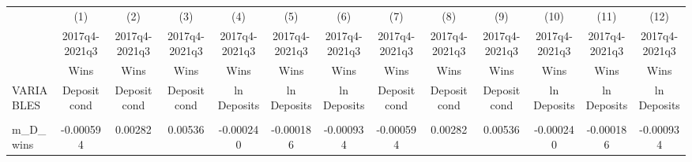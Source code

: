 \documentclass[]{article}
\begin{document}
\begin{center}
\begin{tabular}{lcccccccccccc} \hline
 & (1) & (2) & (3) & (4) & (5) & (6) & (7) & (8) & (9) & (10) & (11) & (12) \\
 & 2017q4-2021q3 & 2017q4-2021q3 & 2017q4-2021q3 & 2017q4-2021q3 & 2017q4-2021q3 & 2017q4-2021q3 & 2017q4-2021q3 & 2017q4-2021q3 & 2017q4-2021q3 & 2017q4-2021q3 & 2017q4-2021q3 & 2017q4-2021q3 \\
 & Wins & Wins & Wins & Wins & Wins & Wins & Wins & Wins & Wins & Wins & Wins & Wins \\
VARIABLES & Deposit cond & Deposit cond & Deposit cond & ln Deposits & ln Deposits & ln Deposits & Deposit cond & Deposit cond & Deposit cond & ln Deposits & ln Deposits & ln Deposits \\ \hline
\vspace{4pt} & \begin{footnotesize}\end{footnotesize} & \begin{footnotesize}\end{footnotesize} & \begin{footnotesize}\end{footnotesize} & \begin{footnotesize}\end{footnotesize} & \begin{footnotesize}\end{footnotesize} & \begin{footnotesize}\end{footnotesize} & \begin{footnotesize}\end{footnotesize} & \begin{footnotesize}\end{footnotesize} & \begin{footnotesize}\end{footnotesize} & \begin{footnotesize}\end{footnotesize} & \begin{footnotesize}\end{footnotesize} & \begin{footnotesize}\end{footnotesize} \\
m\_D\_wins & -0.000594 & 0.00282 & 0.00536 & -0.000240 & -0.000186 & -0.000934 & -0.000594 & 0.00282 & 0.00536 & -0.000240 & -0.000186 & -0.000934 \\

\end{tabular}
\end{center}
\end{document}
